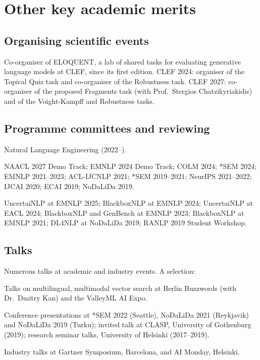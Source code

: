 \documentclass[12pt,a4paper]{article}
\newenvironment{entries}{%
  \begin{list}{}{%
    \setlength{\labelwidth}{2.7cm}%
    \setlength{\labelsep}{0.3cm}%
    \setlength{\leftmargin}{3.0cm}%
    \setlength{\itemsep}{2pt}%
    \setlength{\parsep}{0pt}%
    \setlength{\topsep}{1pt}%
    \renewcommand{\makelabel}[1]{##1\hfil}}}%
  {\end{list}}
\begin{document}
\section{Other key academic merits}
\subsection{Organising scientific events}
\begin{entries}
  \item[2024--] Co-organiser of ELOQUENT, a lab of shared tasks for evaluating generative language models at CLEF, since its first edition. CLEF 2024: organiser of the Topical Quiz task and co-organiser of the Robustness task. CLEF 2027: co-organiser of the proposed Fragments task (with Prof.\ Stergios Chatzikyriakidis) and of the Voight-Kampff and Robustness tasks.
\end{entries}
\subsection{Programme committees and reviewing}
\begin{entries}
  \item[Journal] Natural Language Engineering (2022--).
  \item[Conferences] NAACL 2027 Demo Track; EMNLP 2024 Demo Track; COLM 2024; *SEM 2024; EMNLP 2021--2023; ACL-IJCNLP 2021; *SEM 2019--2021; NeurIPS 2021--2022; IJCAI 2020; ECAI 2019; NoDaLiDa 2019.
  \item[Workshops] UncertaiNLP at EMNLP 2025; BlackboxNLP at EMNLP 2024; UncertaiNLP at EACL 2024; BlackboxNLP and GenBench at EMNLP 2023; BlackboxNLP at EMNLP 2021; DL4NLP at NoDaLiDa 2019; RANLP 2019 Student Workshop.
\end{entries}
\subsection{Talks}
Numerous talks at academic and industry events. A selection:
\begin{entries}
  \item[2022] Talks on multilingual, multimodal vector search at Berlin Buzzwords (with Dr.\ Dmitry Kan) and the ValleyML AI Expo.
  \item[2017--2022] Conference presentations at *SEM 2022 (Seattle), NoDaLiDa 2021 (Reykjavik) and NoDaLiDa 2019 (Turku); invited talk at CLASP, University of Gothenburg (2019); research seminar talks, University of Helsinki (2017--2019).
  \item[2018] Industry talks at Gartner Symposium, Barcelona, and AI Monday, Helsinki.
\end{entries}
\end{document}
